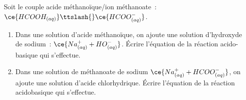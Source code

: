 Soit le couple acide méthanoïque/ion méthanoate~:
$\ce{HCOOH_{(aq)}}\ttslash{}\ce{HCOO^{-}_{(aq)}}$.
\begin{enumerate}
    \item Dans une solution d'acide méthanoïque, on ajoute une solution
          d'hydroxyde de sodium~: $\ce{Na^+_{(aq)} + HO^-_{(aq)}}$.
          Écrire l'équation de la réaction acido-basique qui s'effectue.
    \item Dans une solution de méthanoate de sodium
          $\ce{Na^+_{(aq)} + HCOO^-_{(aq)}}$, on ajoute une solution d'acide
          chlorhydrique. Écrire l'équation de la réaction acidobasique qui
          s'effectue.
\end{enumerate}


